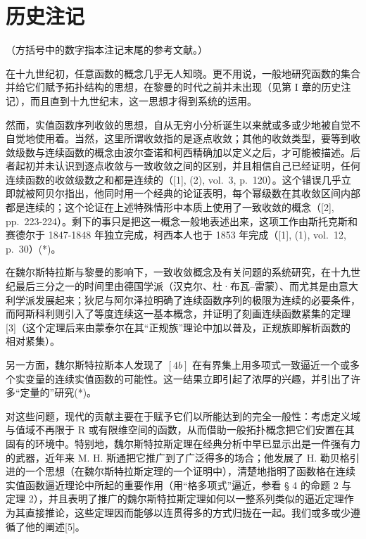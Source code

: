 \section*{历史注记}
{}

（方括号中的数字指本注记末尾的参考文献。）

在十九世纪初，任意函数的概念几乎无人知晓。更不用说，一般地研究函数的集合并给它们赋予拓扑结构的思想，在黎曼的时代之前并未出现（见第 I 章的历史注记），而且直到十九世纪末，这一思想才得到系统的运用。

然而，实值函数序列收敛的思想，自从无穷小分析诞生以来就或多或少地被自觉不自觉地使用着。当然，这里所谓收敛指的是逐点收敛；其他的收敛类型，要等到收敛级数与连续函数的概念由波尔查诺和柯西精确加以定义之后，才可能被描述。后者起初并未认识到逐点收敛与一致收敛之间的区别，并且相信自己已经证明，任何连续函数的收敛级数之和都是连续的（{[}1{]}, (2), vol.~3, p.~120）。这个错误几乎立即就被阿贝尔指出，他同时用一个经典的论证表明，每个幂级数在其收敛区间内部都是连续的；这个论证在上述特殊情形中本质上使用了一致收敛的概念（{[}2{]}, pp.~223-224）。剩下的事只是把这一概念一般地表述出来，这项工作由斯托克斯和赛德尔于 1847-1848 年独立完成，柯西本人也于 1853 年完成（{[}1{]}, (1), vol.~12, p.~30）(*)。

在魏尔斯特拉斯与黎曼的影响下，一致收敛概念及有关问题的系统研究，在十九世纪最后三分之一的时间里由德国学派（汉克尔、杜·布瓦–雷蒙）、而尤其是由意大利学派发展起来；狄尼与阿尔泽拉明确了连续函数序列的极限为连续的必要条件，而阿斯科利则引入了等度连续这一基本概念，并证明了刻画连续函数紧集的定理{[}3{]}（这个定理后来由蒙泰尔在其“正规族”理论中加以普及，正规族即解析函数的相对紧集）。

另一方面，魏尔斯特拉斯本人发现了 \([4b]\) 在有界集上用多项式一致逼近一个或多个实变量的连续实值函数的可能性。这一结果立即引起了浓厚的兴趣，并引出了许多“定量的”研究(*)。

对这些问题，现代的贡献主要在于赋予它们以所能达到的完全一般性：考虑定义域与值域不再限于 R 或有限维空间的函数，从而借助一般拓扑概念把它们安置在其固有的环境中。特别地，魏尔斯特拉斯定理在经典分析中早已显示出是一件强有力的武器，近年来 M. H. 斯通把它推广到了广泛得多的场合；他发展了 H. 勒贝格引进的一个思想（在魏尔斯特拉斯定理的一个证明中），清楚地指明了函数格在连续实值函数逼近理论中所起的重要作用（用“格多项式”逼近，参看 § 4 的命题 2 与定理 2），并且表明了推广的魏尔斯特拉斯定理如何以一整系列类似的逼近定理作为其直接推论，这些定理因而能够以连贯得多的方式归拢在一起。我们或多或少遵循了他的阐述{[}5{]}。

